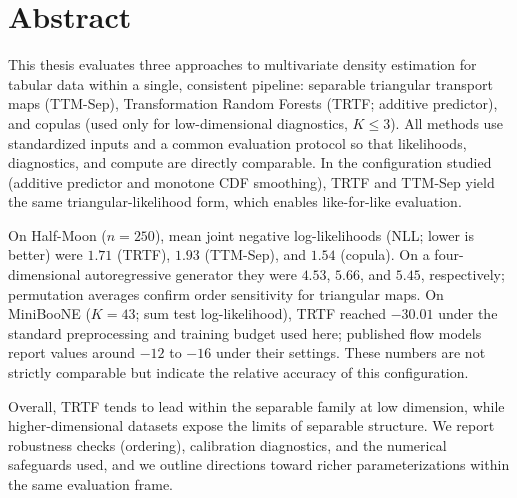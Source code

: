 \documentclass[11pt,a4paper,twoside]{book}\usepackage[]{graphicx}\usepackage[]{xcolor}
\begin{document}





\graphicspath{{./figure/}}
\frontmatter
{}
\setcounter{tocdepth}{1}

\chapter*{Abstract}

This thesis evaluates three approaches to multivariate density estimation for tabular data within a single, consistent pipeline: separable triangular transport maps (TTM-Sep), Transformation Random Forests (TRTF; additive predictor), and copulas (used only for low-dimensional diagnostics, $K\!\le\!3$). All methods use standardized inputs and a common evaluation protocol so that likelihoods, diagnostics, and compute are directly comparable. In the configuration studied (additive predictor and monotone CDF smoothing), TRTF and TTM-Sep yield the same triangular-likelihood form, which enables like-for-like evaluation.

On Half-Moon ($n=250$), mean joint negative log-likelihoods (NLL; lower is better) were $1.71$ (TRTF), $1.93$ (TTM-Sep), and $1.54$ (copula). On a four-dimensional autoregressive generator they were $4.53$, $5.66$, and $5.45$, respectively; permutation averages confirm order sensitivity for triangular maps. On MiniBooNE ($K=43$; sum test log-likelihood), TRTF reached $-30.01$ under the standard preprocessing and training budget used here; published flow models report values around $-12$ to $-16$ under their settings. These numbers are not strictly comparable but indicate the relative accuracy of this configuration.

Overall, TRTF tends to lead within the separable family at low dimension, while higher-dimensional datasets expose the limits of separable structure. We report robustness checks (ordering), calibration diagnostics, and the numerical safeguards used, and we outline directions toward richer parameterizations within the same evaluation frame.

\tableofcontents
{}

\cleardoublepage
\mainmatter




\end{document}
